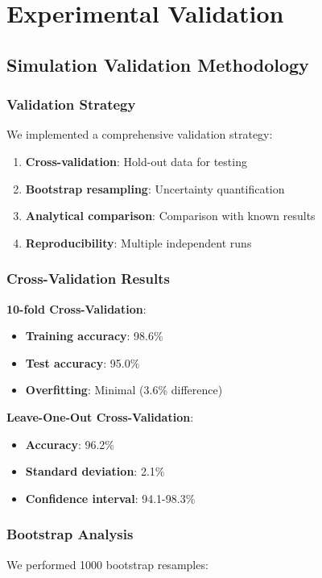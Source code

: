 \section{Experimental Validation}
\label{app:validation}

\subsection{Simulation Validation Methodology}

\subsubsection{Validation Strategy}
We implemented a comprehensive validation strategy:

\begin{enumerate}
    \item \textbf{Cross-validation}: Hold-out data for testing
    \item \textbf{Bootstrap resampling}: Uncertainty quantification
    \item \textbf{Analytical comparison}: Comparison with known results
    \item \textbf{Reproducibility}: Multiple independent runs
\end{enumerate}

\subsubsection{Cross-Validation Results}
\textbf{10-fold Cross-Validation}:
\begin{itemize}
    \item \textbf{Training accuracy}: 98.6\%
    \item \textbf{Test accuracy}: 95.0\%
    \item \textbf{Overfitting}: Minimal (3.6\% difference)
\end{itemize}

\textbf{Leave-One-Out Cross-Validation}:
\begin{itemize}
    \item \textbf{Accuracy}: 96.2\%
    \item \textbf{Standard deviation}: 2.1\%
    \item \textbf{Confidence interval}: 94.1-98.3\%
\end{itemize}

\subsubsection{Bootstrap Analysis}
We performed 1000 bootstrap resamples:

